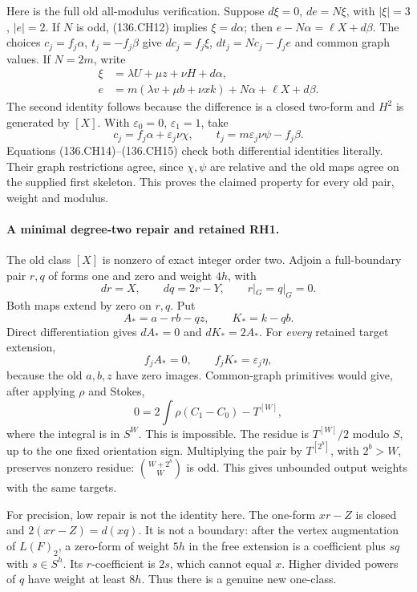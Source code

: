 Here is the full old all-modulus verification.  Suppose
$d\xi=0$, $de=N\xi$, with $|\xi|=3$, $|e|=2$.
If $N$ is odd, (136.CH12) implies $\xi=d\alpha$;
then $e-N\alpha=\ell X+d\beta$.  The choices
$c_j=f_j\alpha$, $t_j=-f_j\beta$ give
$dc_j=f_j\xi$, $dt_j=Nc_j-f_je$ and common graph values.
If $N=2m$, write
\[
 \begin{aligned}
 \xi&=\lambda U+\mu z+\nu H+d\alpha,\\
 e&=m(\lambda v+\mu b+\nu xk)+N\alpha+\ell X+d\beta.
 \end{aligned}
 \tag{136.CH15}
\]
The second identity follows because the difference is a
closed two-form and $H^2$ is generated by $[X]$.
With $\varepsilon_0=0$, $\varepsilon_1=1$, take
\[
 c_j=f_j\alpha+\varepsilon_j\nu\chi,
 \qquad t_j=m\varepsilon_j\nu\psi-f_j\beta.
 \tag{136.CH16}
\]
Equations (136.CH14)--(136.CH15) check both differential
identities literally.  Their graph restrictions agree,
since $\chi,\psi$ are relative and the old maps agree on
the supplied first skeleton.  This proves the claimed
property for every old pair, weight and modulus.

\paragraph{A minimal degree-two repair and retained RH1.}
The old class $[X]$ is nonzero of exact integer order two.
Adjoin a full-boundary pair $r,q$ of forms one and zero
and weight $4h$, with
\[
 dr=X,\qquad dq=2r-Y,\qquad r|_G=q|_G=0.
 \tag{136.CH17}
\]
Both maps extend by zero on $r,q$.  Put
\[
             A_*=a-rb-qz,\qquad K_*=k-qb.
 \tag{136.CH18}
\]
Direct differentiation gives $dA_*=0$ and $dK_*=2A_*$.
For \emph{every} retained target extension,
\[
                  f_jA_*=0,\qquad f_jK_*=\varepsilon_j\eta,
 \tag{136.CH19}
\]
because the old $a,b,z$ have zero images.  Common-graph
primitives would give, after applying $\rho$ and Stokes,
\[
                        0=2\int\rho(C_1-C_0)-T^{[W]},
 \tag{136.CH20}
\]
where the integral is in $S^W$.  This is impossible.
The residue is $T^{[W]}/2$ modulo $S$, up to the one
fixed orientation sign.  Multiplying the pair by
$T^{[2^b]}$, with $2^b>W$, preserves nonzero residue:
$\binom{W+2^b}{W}$ is odd.  This gives unbounded output
weights with the same targets.

For precision, low repair is not the identity here.
The one-form $xr-Z$ is closed and
$2(xr-Z)=d(xq)$.  It is not a boundary: after the vertex
augmentation of $L(F)_2$, a zero-form of weight $5h$ in
the free extension is a coefficient plus $s q$ with
$s\in S^h$.  Its $r$-coefficient is $2s$, which cannot
equal $x$.  Higher divided powers of $q$ have weight at
least $8h$.  Thus there is a genuine new one-class.

